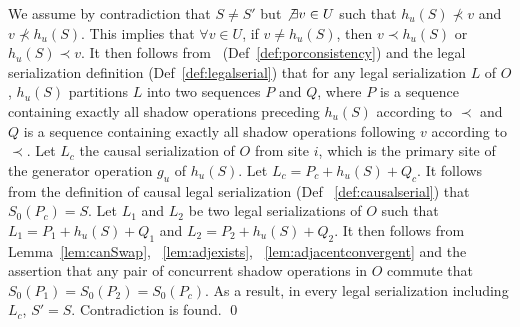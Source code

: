 We assume by contradiction that $S \neq S'$ but $\not\exists v\in U$ such that $h_u(S)\not\prec v$ and $v\not\prec h_u(S)$. This implies
that $\forall v \in U$, if $v \neq h_u(S)$, then $v \prec h_u(S)$ or $h_u(S) \prec v$. It then follows from \PRCN\ (Def~\ref{def:porconsistency})
and the legal serialization definition (Def~\ref{def:legalserial}) that for any legal serialization $L$ of $O$, $h_u(S)$ partitions
$L$ into two sequences $P$ and $Q$, where $P$ is a sequence containing exactly all shadow operations preceding $h_u(S)$ according to $\prec$ 
and $Q$ is a sequence containing exactly all shadow operations following $v$ according to $\prec$. 
Let $L_{c}$ the causal serialization of $O$ from site $i$, which is the primary site of the generator operation $g_u$ of $h_u(S)$. 
Let $L_c = P_c + h_u(S) + Q_c$. It follows from the definition of causal legal serialization (Def ~\ref{def:causalserial}) that $S_0(P_c) = S$.
Let $L_1$ and $L_2$ be two legal serializations of $O$ such that $L_1 = P_1 + h_u(S) + Q_1$ and $L_2 = P_2 + h_u(S) + Q_2$. 
It then follows from Lemma~\ref{lem:canSwap}, ~\ref{lem:adjexists}, ~\ref{lem:adjacentconvergent}
and the assertion that any pair of concurrent shadow operations in $O$ commute that $S_0(P_1) = S_0(P_2) = S_0(P_c)$. 
As a result, in every legal serialization including $L_c$, $S' = S$. Contradiction is found.
 \qed
\fi

